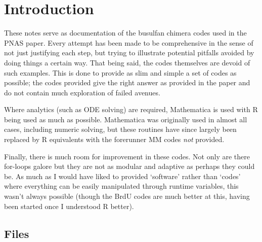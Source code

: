 \documentclass{tufte-book} %
\begin{document}

\cleardoublepage
\chapter*{Introduction} %
\begin{fullwidth}
These notes serve as documentation of the busulfan chimera codes used in the PNAS paper. Every attempt has been made to be comprehensive in the sense of not just justifying each step, but trying to illustrate potential pitfalls avoided by doing things a certain way. That being said, the codes themselves are devoid of such examples. This is done to provide as slim and simple a set of codes as possible; the codes provided give the right answer as provided in the paper and do not contain much exploration of failed avenues. 

Where analytics (such as ODE solving) are required, Mathematica is used with R being used as much as possible. Mathematica was originally used in almost all cases, including numeric solving, but these routines have since largely been replaced by R equivalents with the forerunner MM codes \textit{not} provided.

Finally, there is much room for improvement in these codes. Not only are there for-loops galore but they are not as modular and adaptive as perhaps they could be. As much as I would have liked to provided `software' rather than `codes' where everything can be easily manipulated through runtime variables, this wasn't always possible (though the BrdU codes are much better at this, having been started once I understood R better).



\section{Files}


\end{fullwidth}
\end{document}
